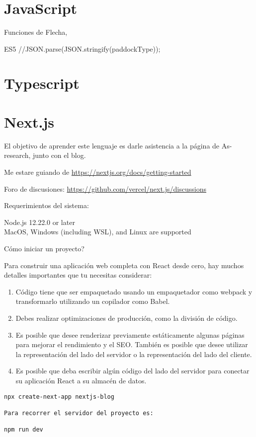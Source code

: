 \chapter{JavaScript}


Funciones de Flecha, 

ES5 //JSON.parse(JSON.stringify(paddockType));

\chapter{Typescript}

\chapter{Next.js}

El objetivo de aprender este lenguaje es darle asistencia a la p\'agina de As-research, junto con el blog. 

Me estare guiando de \url{https://nextjs.org/docs/getting-started}

Foro de discusiones: \url{https://github.com/vercel/next.js/discussions}

Requerimientos del sistema: 

Node.js 12.22.0 or later\\
MacOS, Windows (including WSL), and Linux are supported


C\'omo iniciar un proyecto?

Para construir una aplicaci\'on web completa con React desde cero, hay muchos detalles importantes que tu necesitas considerar: 
\begin{enumerate}
	\item C\'odigo tiene que ser empaquetado usando un empaquetador como webpack y transformarlo utilizando un copilador como Babel.
	\item Debes realizar optimizaciones de producci\'on, como la divisi\'on de c\'odigo.
	\item Es posible que desee renderizar previamente est\'aticamente algunas p\'aginas para mejorar el rendimiento y el SEO. Tambi\'en es posible que desee utilizar la representaci\'on del lado del servidor o la representaci\'on del lado del cliente.
	
	
	\item Es posible que deba escribir alg\'un c\'odigo del lado del servidor para conectar su aplicaci\'on React a su almac\'en de datos.
\end{enumerate}
\begin{verbatim}
npx create-next-app nextjs-blog

Para recorrer el servidor del proyecto es:

npm run dev
\end{verbatim}





